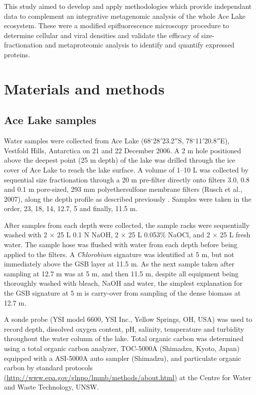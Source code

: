 This study aimed to develop and apply methodologies which provide independant data to complement an integrative metagenomic analysis of the whole Ace Lake ecosystem.
These were a modified epifluorescence microscopy procedure to determine cellular and viral densities and validate the efficacy of size-fractionation and metaproteomic analysis to identify and quantify expressed proteins.


\section{Materials and methods}
\label{sec:ace_mm}
\subsection{Ace Lake samples}
Water samples were collected from Ace Lake (68$^{\circ}$28$'$23.2$''$S, 78$^{\circ}$11$'$20.8$''$E), Vestfold Hills, Antarctica on 21 and 22 December 2006. 
A 2 m hole positioned above the deepest point (25 m depth) of the lake was drilled through the ice cover of Ace Lake to reach the lake surface.
A volume of 1--10 L was collected by sequential size fractionation through a 20 \textmu{}m pre-filter directly onto filters 3.0, 0.8 and 0.1 \textmu{}m pore-sized, 293 mm polyethersulfone membrane filters (Rusch et al., 2007), along the depth profile as described previously \cite{Ng2010a}.
Samples were taken in the order, 23, 18, 14, 12.7, 5 and finally, 11.5 m.

After samples from each depth were collected, the sample racks were sequentially washed with 2 $\times$ 25 L 0.1 N NaOH, 2 $\times$ 25 L 0.053\% NaOCl, and 2 $\times$ 25 L fresh water. 
The sample hose was flushed with water from each depth before being applied to the filters. 
A \emph{Chlorobium} signature was identified at 5 m, but not immediately above the \ac{GSB} layer at 11.5 m. 
As the next sample taken after sampling at 12.7 m was at 5 m, and then 11.5 m, despite all equipment being thoroughly washed with bleach, NaOH and water, 
the simplest explanation for the \ac{GSB} signature at 5 m is carry-over from sampling of the dense biomass at 12.7 m. 

A sonde probe (\textsc{YSI} model 6600, \textsc{YSI} Inc., Yellow Springs, \textsc{OH}, \textsc{USA}) was used to record depth, dissolved oxygen content, pH, salinity, temperature and turbidity throughout the water column of the lake. 
Total organic carbon was determined using a total organic carbon analyzer, TOC-5000A (Shimadzu, Kyoto, Japan) equipped with a \textsc{ASI}-5000A auto sampler (Shimadzu), and particulate organic carbon by standard protocols 
\url{(http://www.epa.gov/glnpo/lmmb/methods/about.html)} 
at the Centre for Water and Waste Technology, \textsc{UNSW}.

